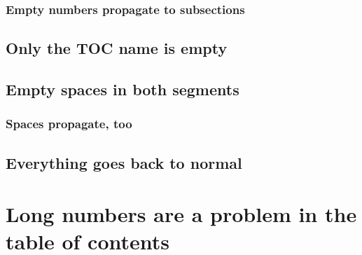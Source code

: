 \documentclass{homework}
\begin{document}
\subsubsection{Empty numbers propagate to subsections}

\lipsum[16]

\subsection[zz|]{Only the TOC name is empty}

\lipsum[17]

\subsection[ | ]{Empty spaces in both segments}

\subsubsection{Spaces propagate, too}

\lipsum[18]

\subsection{Everything goes back to normal}

\lipsum[19]

\section[2011|]{Long numbers are a problem in the table of contents}
\end{document}
